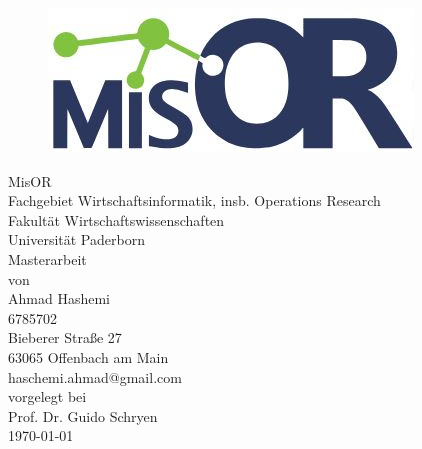 \begin{titlepage}
\begin{figure}[H]
\centering
	\includegraphics[scale=0.4]{fotos/misOR}
\end{figure}
\begin{center}
MisOR\\
Fachgebiet Wirtschaftsinformatik, insb. Operations Research \\
Fakultät Wirtschaftswissenschaften\\
Universität Paderborn\\     
\vspace{8ex}
\Large
Masterarbeit\\
\vspace{8ex}
\textbf{}
\vspace{6ex}
\normalsize
von\\
Ahmad Hashemi\\
6785702\\
Bieberer Straße 27\\
63065 Offenbach am Main\\
haschemi.ahmad@gmail.com\\
\vspace{8ex}
vorgelegt bei\\
Prof. Dr. Guido Schryen\\
\normalsize
\vspace{16ex}
\today
\end{center}
\end{titlepage}
